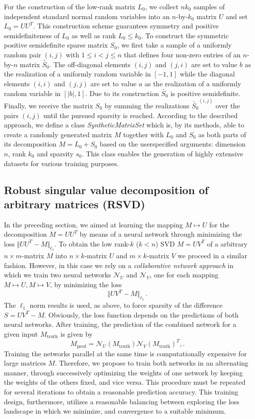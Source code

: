 For the construction of the low-rank matrix $L_0$, we collect $nk_0$ samples of independent standard normal random variables into an $n$-by-$k_0$ matrix $U$ and set $L_0 = UU^T$. This construction scheme guarantees symmetry and positive semidefiniteness of $L_0$ as well as rank $L_0 \leq k_0$. To construct the symmetric positive semidefinite sparse matrix $S_0$, we first take a sample of a uniformly random pair $(i,j)$ with $1 \leq i < j \leq n$ that defines four non-zero entries of an $n$-by-$n$ matrix $\tilde{S_0}$. The off-diagonal elements $(i,j)$ and $(j,i)$ are set to value $b$ as the realization of a uniformly random variable in $[-1,1]$ while the diagonal elements $(i,i)$ and $(j,j)$ are set to value $a$ as the realization of a uniformly random variable in $[\vert b \vert,1]$. Due to its construction $\tilde{S_0}$ is positive semidefinite. Finally, we receive the matrix $S_0$ by summing the realizations $\tilde{S_0}^{(i,j)}$ over the pairs $(i,j)$ until the pursued sparsity is reached. According to the described approach, we define a class \textit{SyntheticMatrixSet} which is, by its methods, able to create a randomly generated matrix $M$ together with $L_0$ and $S_0$ as both parts of its decomposition  $M = L_0 + S_0$ based on the userspecified arguments: dimension $n$, rank $k_0$ and sparsity $s_0$. This class enables the generation of highly extensive datasets for various training purposes.


\subsection{Robust singular value decomposition of arbitrary matrices (RSVD)}

In the preceding section, we aimed at learning the mapping $M\mapsto U$ for the decomposition $M = UU^T$ by means of a neural network through minimizing the loss $\Vert UU^T - M \Vert_{\ell_1}$. To obtain the low rank-$k$ ($k<n$) SVD $M = UV^T$ of a arbitrary $n\times m$-matrix $M$ into $n\times k$-matrix $U$ and $m\times k$-matrix $V$ we proceed in a similar fashion. However, in this case we rely on a \textit{collaborative network approach} in which we train two neural networks $\mathcal{N}_U$ and $\mathcal{N}_V$, one for each mapping $M\mapsto U, M\mapsto V$, by minimizing the loss
\[
\Vert UV^T - M \Vert_{\ell_1} \,.
\]
The $\ell_1$ norm results is used, as above, to force sparsity of the difference $S = UV^T -M$. Obviously, the loss function depends on the predictions of both neural networks. After training, the prediction of the combined network for a given input $M_\text{truth}$ is given by
\[
M_\text{pred} = \mathcal{N}_U(M_\text{truth})\mathcal{N}_V(M_\text{truth})^T ,.
\]
Training the networks parallel at the same time is computationally expensive for large matrices $M$. Therefore, we propose to train both networks in an alternating manner, through successively optimizing the weights of one network by keeping the weights of the others fixed, and vice versa. This procedure must be repeated for several iterations to obtain a reasonable prediction accuracy. This training design, furthermore, utilizes a reasonable balancing between exploring the loss landscape in which we minimize, and convergence to a suitable minimum.

